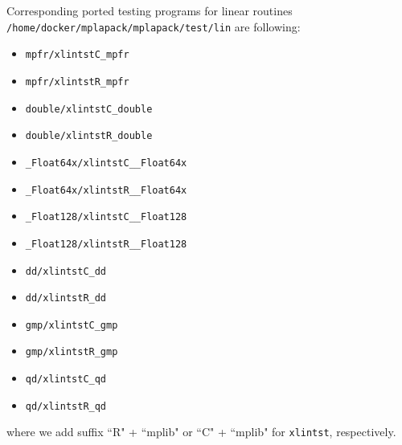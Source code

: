 \documentclass[12pt]{article}
\begin{document}
Corresponding ported testing programs for linear routines {\tt /home/docker/mplapack/mplapack/test/lin} are following:
\begin{itemize}
    \item {\tt mpfr/xlintstC\_mpfr}
    \item {\tt mpfr/xlintstR\_mpfr}
    \item {\tt double/xlintstC\_double}
    \item {\tt double/xlintstR\_double}
    \item {\tt \_Float64x/xlintstC\_\_Float64x}
    \item {\tt \_Float64x/xlintstR\_\_Float64x}
    \item {\tt \_Float128/xlintstC\_\_Float128}
    \item {\tt \_Float128/xlintstR\_\_Float128}
    \item {\tt dd/xlintstC\_dd}
    \item {\tt dd/xlintstR\_dd}
    \item {\tt gmp/xlintstC\_gmp}
    \item {\tt gmp/xlintstR\_gmp}
    \item {\tt qd/xlintstC\_qd}
    \item {\tt qd/xlintstR\_qd}
\end{itemize}
where we add suffix ``R" + ``mplib" or ``C" + ``mplib" for {\tt xlintst}, respectively.
\end{document}
